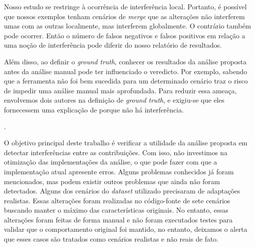 Nosso estudo se restringe à ocorrência de interferência local. Portanto, é possível que nossos exemplos tenham cenários de \emph{merge} que as alterações não interferem umas com as outras localmente, mas interferem globalmente. O contrário também pode ocorrer. Então o número de falsos negativos e falsos positivos em relação a uma noção de interferência pode diferir do nosso relatório de resultados.



Além disso, ao definir o \emph{ground truth}, conhecer os resultados da análise proposta antes da análise manual pode ter influenciado o veredicto. Por exemplo,
sabendo que a ferramenta não foi bem sucedida para um determinado cenário traz o risco de impedir uma análise manual mais aprofundada. Para reduzir essa ameaça, envolvemos dois autores na definição de \emph{ground truth}, e exigiu-se que eles fornecessem uma explicação de porque não há interferência. 

.

O objetivo principal deste trabalho é verificar a utilidade da análise proposta em detectar interferências entre as contribuições. Com isso, não investimos na otimização das implementações da análise, o que pode fazer com que a implementação atual apresente erros. Alguns problemas conhecidos já foram mencionados, mas podem existir outros problemas que ainda não foram detectados. 
Alguns dos cenários do \emph{dataset} utilizado precisaram de adaptações realistas. Essas alterações foram realizadas no código-fonte de sete cenários buscando manter o máximo das características originais. No entanto, essas alterações foram feitas de forma manual e não foram executados testes para validar que o comportamento original foi mantido, no entanto, deixamos o alerta que esses casos são tratados como cenários realistas e não reais de fato.

